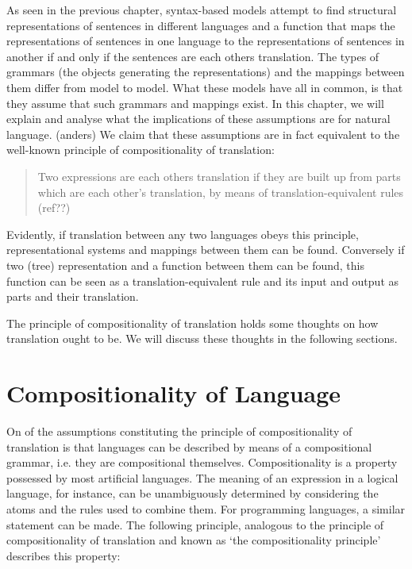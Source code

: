 \documentclass{report}
\theoremstyle{definition}
\theoremstyle{plain}
\begin{document}

As seen in the previous chapter, syntax-based models attempt to find structural representations of sentences in different languages and a function that maps the representations of sentences in one language to the representations of sentences in another if and only if the sentences are each others translation. The types of grammars (the objects generating the representations) and the mappings between them differ from model to model. What these models have all in common, is that they assume that such grammars and mappings exist. In this chapter, we will explain and analyse what the implications of these assumptions are for natural language. (anders) We claim that these assumptions are in fact equivalent to the well-known principle of compositionality of translation:

\begin{quote}
Two expressions are each others translation if they are built up from parts which are each other's translation, by means of translation-equivalent rules (ref??)
\end{quote}

Evidently, if translation between any two languages obeys this principle, representational systems and mappings between them can be found. Conversely if two (tree) representation and a function between them can be found, this function can be seen as a translation-equivalent rule and its input and output as parts and their translation.

The principle of compositionality of translation holds some thoughts on how translation ought to be. We will discuss these thoughts in the following sections.


\section{Compositionality of Language}

On of the assumptions constituting the principle of compositionality of translation is that languages can be described by means of a compositional grammar, i.e. they are compositional themselves. Compositionality is a property possessed by most artificial languages. The meaning of an expression in a logical language, for instance, can be unambiguously determined by considering the atoms and the rules used to combine them. For programming languages, a similar statement can be made. The following principle, analogous to the principle of compositionality of translation and known as `the compositionality principle' describes this property:
\end{document}

